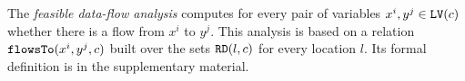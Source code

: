 The {\em feasible data-flow analysis} computes for every pair of variables $x^i, y^j \in \mathtt{LV}(c)$
 whether there is a flow from $x^i$ to $y^j$. 
 This analysis is based on a relation $\mathtt{flowsTo}(x^i, y^j, c)$ built over the sets $\mathtt{RD}(l, c)$ for every location $l$. Its formal definition is in the supplementary material.  
